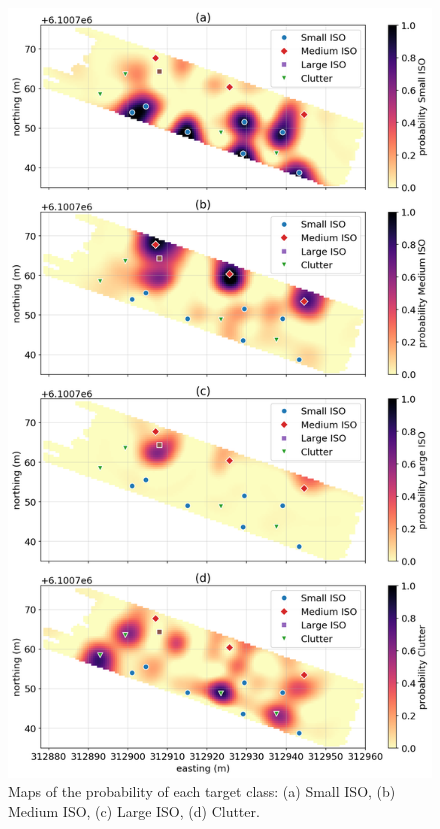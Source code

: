 \begin{figure}[htb]
    \vspace{-0.1cm}
    \begin{center}
    \includegraphics[width=\columnwidth]{figures/synthetic-field-probs.png}
    \end{center}
    \vspace{-0.5cm}
\caption{
    Maps of the probability of each target class: (a) Small ISO, (b) Medium ISO, (c) Large ISO, (d) Clutter.
}
\label{fig:synthetic-field-probs}
\vspace{-0.1cm}
\end{figure}
